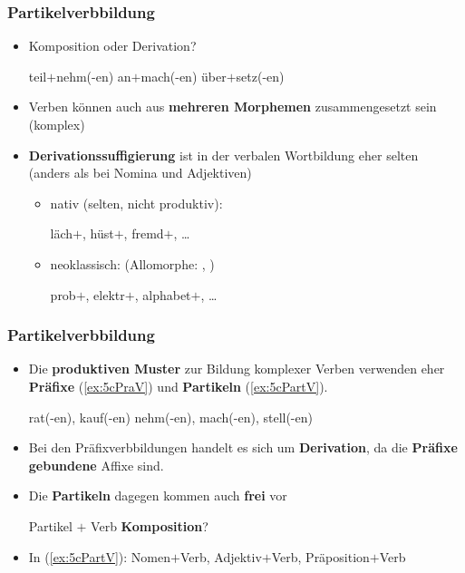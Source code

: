 \begin{frame}
\frametitle{Partikelverbbildung}

\begin{itemize}
\item Komposition oder Derivation?

\ea 
\ea teil$+$nehm(-en)
\ex an$+$mach(-en)
\ex über$+$setz(-en) 
\z 
\z 
\pause 

\item Verben können auch aus \textbf{mehreren Morphemen} zusammengesetzt sein (komplex)

\item \textbf{Derivationssuffigierung} ist in der verbalen Wortbildung eher selten\\
(anders als bei Nomina und Adjektiven)

\begin{itemize}
\item nativ (selten, nicht produktiv): 

\ea läch$+$, hüst$+$, fremd$+$, \dots
\z

\item neoklassisch:  (Allomorphe: , )

\ea prob$+$, elektr$+$, alphabet$+$, \dots 
\z
\end{itemize}
\end{itemize}

\end{frame}


\begin{frame}
\frametitle{Partikelverbbildung}

\begin{itemize}
\item Die \textbf{produktiven Muster} zur Bildung komplexer Verben verwenden eher \textbf{Präfixe} (\ref{ex:5cPraV}) und \textbf{Partikeln} (\ref{ex:5cPartV}).

\ea 
\ea\label{ex:5cPraV} rat(-en), kauf(-en)
\ex\label{ex:5cPartV} nehm(-en), mach(-en), stell(-en)
\z 
\z 

\item Bei den Präfixverbbildungen handelt es sich um \textbf{Derivation}, da die \textbf{Präfixe} \textbf{gebundene} Affixe sind.


\item Die \textbf{Partikeln} dagegen kommen auch \textbf{frei} vor

\medskip

Partikel $+$ Verb \ras \textbf{Komposition}?

\item In (\ref{ex:5cPartV}): Nomen$+$Verb, Adjektiv$+$Verb, Präposition$+$Verb

\end{itemize}

\end{frame}


